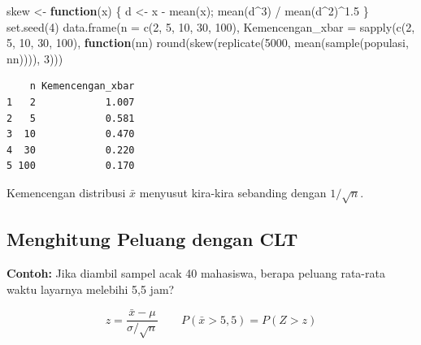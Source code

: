 \documentclass[
  indonesian,
  letterpaper,
]{book}
\newenvironment{Shaded}{\begin{snugshade}}{\end{snugshade}}
\newcommand{\AttributeTok}[1]{\textcolor[rgb]{0.40,0.45,0.13}{#1}}
\newcommand{\ControlFlowTok}[1]{\textcolor[rgb]{0.00,0.23,0.31}{\textbf{#1}}}
\newcommand{\DecValTok}[1]{\textcolor[rgb]{0.68,0.00,0.00}{#1}}
\newcommand{\FloatTok}[1]{\textcolor[rgb]{0.68,0.00,0.00}{#1}}
\newcommand{\FunctionTok}[1]{\textcolor[rgb]{0.28,0.35,0.67}{#1}}
\newcommand{\NormalTok}[1]{\textcolor[rgb]{0.00,0.23,0.31}{#1}}
\newcommand{\OtherTok}[1]{\textcolor[rgb]{0.00,0.23,0.31}{#1}}
\newcommand{\SpecialCharTok}[1]{\textcolor[rgb]{0.37,0.37,0.37}{#1}}
\begin{document}
\begin{Shaded}
\begin{Highlighting}[]
\NormalTok{skew }\OtherTok{\textless{}{-}} \ControlFlowTok{function}\NormalTok{(x) \{ d }\OtherTok{\textless{}{-}}\NormalTok{ x }\SpecialCharTok{{-}} \FunctionTok{mean}\NormalTok{(x); }\FunctionTok{mean}\NormalTok{(d}\SpecialCharTok{\^{}}\DecValTok{3}\NormalTok{) }\SpecialCharTok{/} \FunctionTok{mean}\NormalTok{(d}\SpecialCharTok{\^{}}\DecValTok{2}\NormalTok{)}\SpecialCharTok{\^{}}\FloatTok{1.5}\NormalTok{ \}}
\FunctionTok{set.seed}\NormalTok{(}\DecValTok{4}\NormalTok{)}
\FunctionTok{data.frame}\NormalTok{(}\AttributeTok{n =} \FunctionTok{c}\NormalTok{(}\DecValTok{2}\NormalTok{, }\DecValTok{5}\NormalTok{, }\DecValTok{10}\NormalTok{, }\DecValTok{30}\NormalTok{, }\DecValTok{100}\NormalTok{),}
           \AttributeTok{Kemencengan\_xbar =} \FunctionTok{sapply}\NormalTok{(}\FunctionTok{c}\NormalTok{(}\DecValTok{2}\NormalTok{, }\DecValTok{5}\NormalTok{, }\DecValTok{10}\NormalTok{, }\DecValTok{30}\NormalTok{, }\DecValTok{100}\NormalTok{), }\ControlFlowTok{function}\NormalTok{(nn)}
             \FunctionTok{round}\NormalTok{(}\FunctionTok{skew}\NormalTok{(}\FunctionTok{replicate}\NormalTok{(}\DecValTok{5000}\NormalTok{, }\FunctionTok{mean}\NormalTok{(}\FunctionTok{sample}\NormalTok{(populasi, nn)))), }\DecValTok{3}\NormalTok{)))}
\end{Highlighting}
\end{Shaded}

\begin{verbatim}
    n Kemencengan_xbar
1   2            1.007
2   5            0.581
3  10            0.470
4  30            0.220
5 100            0.170
\end{verbatim}

Kemencengan distribusi \(\bar{x}\) menyusut kira-kira sebanding dengan
\(1/\sqrt{n}\).

\subsection{Menghitung Peluang dengan
CLT}\label{menghitung-peluang-dengan-clt}

\textbf{Contoh:} Jika diambil sampel acak 40 mahasiswa, berapa peluang
rata-rata waktu layarnya melebihi 5,5 jam?

\[z = \frac{\bar{x} - \mu}{\sigma/\sqrt{n}} \qquad P(\bar{x} > 5{,}5) = P(Z > z)\]
\end{document}
